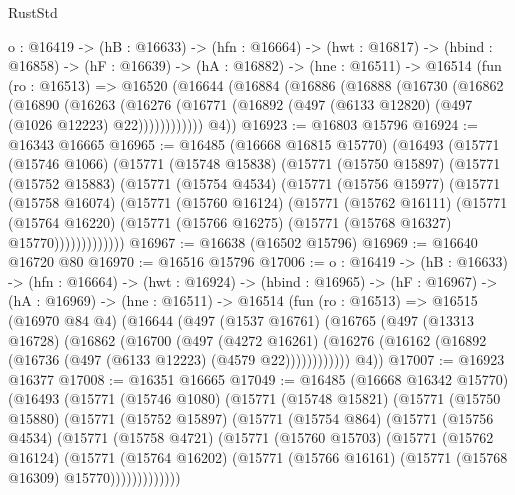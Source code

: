 \begin{lexlean}{RustStd}
\begin{coremodule}
  {o : @16419} ->
  (hB : @16633) ->
  (hfn : @16664) ->
  (hwt : @16817) ->
  (hbind : @16858) ->
  (hF : @16639) ->
  (hA : @16882) ->
  (hne : @16511) ->
  @16514
    (fun (ro : @16513) =>
    @16520
      (@16644
        (@16884
          (@16886
            (@16888
              (@16730
                (@16862
                  (@16890
                    (@16263
                      (@16276
                        (@16771 (@16892 (@497 (@6133 @12820) (@497 (@1026 @12223) @22))))))))))))
        @4))
@16923 := @16803 @15796
@16924 := @16343 @16665
@16965 := @16485
    (@16668 @16815 @15770)
    (@16493
      (@15771
        (@15746 @1066)
        (@15771
          (@15748 @15838)
          (@15771
            (@15750 @15897)
            (@15771
              (@15752 @15883)
              (@15771
                (@15754 @4534)
                (@15771
                  (@15756 @15977)
                  (@15771
                    (@15758 @16074)
                    (@15771
                      (@15760 @16124)
                      (@15771
                        (@15762 @16111)
                        (@15771
                          (@15764 @16220)
                          (@15771 (@15766 @16275) (@15771 (@15768 @16327) @15770)))))))))))))
@16967 := @16638 (@16502 @15796)
@16969 := @16640 @16720 @80
@16970 := @16516 @15796
@17006 := {o : @16419} ->
  (hB : @16633) ->
  (hfn : @16664) ->
  (hwt : @16924) ->
  (hbind : @16965) ->
  (hF : @16967) ->
  (hA : @16969) ->
  (hne : @16511) ->
  @16514
    (fun (ro : @16513) =>
    @16515
      (@16970 @84 @4)
      (@16644
        (@497
          (@1537 @16761)
          (@16765
            (@497
              (@13313 @16728)
              (@16862
                (@16700
                  (@497
                    (@4272 @16261)
                    (@16276 (@16162 (@16892 (@16736 (@497 (@6133 @12223) (@4579 @22))))))))))))
        @4))
@17007 := @16923 @16377
@17008 := @16351 @16665
@17049 := @16485
    (@16668 @16342 @15770)
    (@16493
      (@15771
        (@15746 @1080)
        (@15771
          (@15748 @15821)
          (@15771
            (@15750 @15880)
            (@15771
              (@15752 @15897)
              (@15771
                (@15754 @864)
                (@15771
                  (@15756 @4534)
                  (@15771
                    (@15758 @4721)
                    (@15771
                      (@15760 @15703)
                      (@15771
                        (@15762 @16124)
                        (@15771
                          (@15764 @16202)
                          (@15771 (@15766 @16161) (@15771 (@15768 @16309) @15770)))))))))))))

\end{coremodule}
\end{lexlean}

